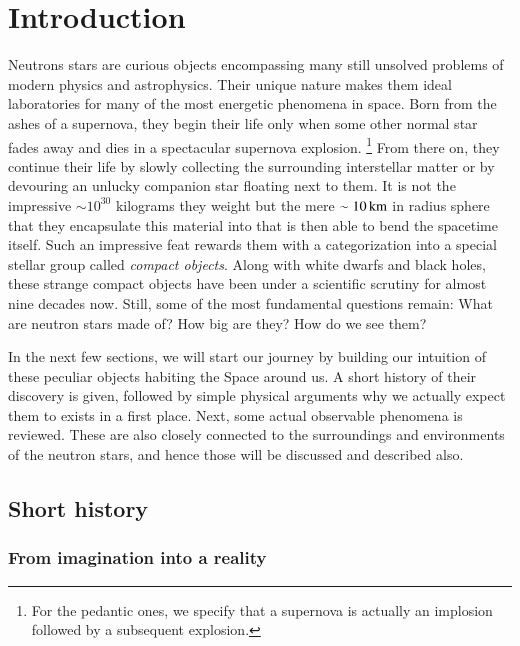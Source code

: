\chapter{Introduction} 
Neutrons stars are curious objects encompassing many still unsolved problems of modern physics and astrophysics.
Their unique nature makes them ideal laboratories for many of the most energetic phenomena in space.
Born from the ashes of a supernova, they begin their life only when some other normal star fades away and dies in a spectacular supernova explosion.%
\footnote{ For the pedantic ones, we specify that a supernova is actually an implosion followed by a subsequent explosion.}
From there on, they continue their life by slowly collecting the surrounding interstellar matter or by devouring an unlucky companion star floating next to them.
It is not the impressive $\sim 10^{30}$ kilograms they weight but the mere $\sim 10 \, \mathrm{km}$ in radius sphere that they encapsulate this material into that is then able to bend the spacetime itself.
Such an impressive feat rewards them with a categorization into a special stellar group called \textit{compact objects}.
Along with white dwarfs and black holes, these strange compact objects have been under a scientific scrutiny for almost nine decades now.
Still, some of the most fundamental questions remain:
What are neutron stars made of?
How big are they?
How do we see them?

In the next few sections, we will start our journey by building our intuition of these peculiar objects habiting the Space around us.
A short history of their discovery is given, followed by simple physical arguments why we actually expect them to exists in a first place.
Next, some actual observable phenomena is reviewed.
These are also closely connected to the surroundings and environments of the neutron stars, and hence those will be discussed and described also.


\section{Short history}
\subsection{From imagination into a reality}


